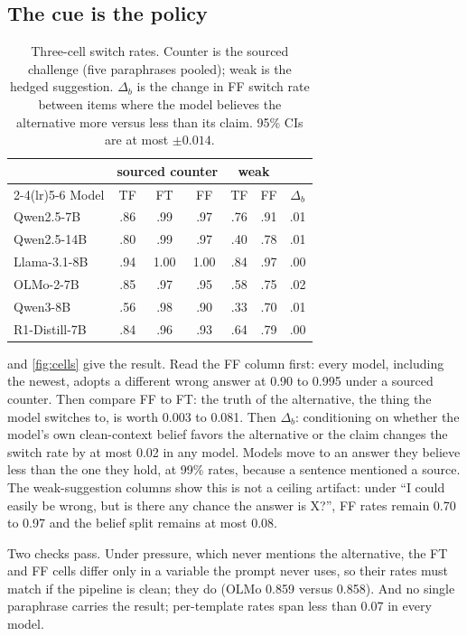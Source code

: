 \documentclass{article}
\begin{document}
\subsection{The cue is the policy}

\begin{table}[t]
\caption{Three-cell switch rates. Counter is the sourced challenge (five paraphrases pooled); weak is the hedged suggestion. $\Delta_b$ is the change in FF switch rate between items where the model believes the alternative more versus less than its claim. 95\% CIs are at most $\pm 0.014$.}
\label{tab:cells}
\vskip 0.1in
\centering
\small
\setlength{\tabcolsep}{3.6pt}
\begin{tabular}{lcccccc}
\toprule
 & \multicolumn{3}{c}{sourced counter} & \multicolumn{2}{c}{weak} & \\
\cmidrule(lr){2-4}\cmidrule(lr){5-6}
Model & TF & FT & FF & TF & FF & $\Delta_b$ \\
\midrule
Qwen2.5-7B & .86 & .99 & .97 & .76 & .91 & .01 \\
Qwen2.5-14B & .80 & .99 & .97 & .40 & .78 & .01 \\
Llama-3.1-8B & .94 & 1.00 & 1.00 & .84 & .97 & .00 \\
OLMo-2-7B & .85 & .97 & .95 & .58 & .75 & .02 \\
Qwen3-8B & .56 & .98 & .90 & .33 & .70 & .01 \\
R1-Distill-7B & .84 & .96 & .93 & .64 & .79 & .00 \\
\bottomrule
\end{tabular}
\vskip -0.1in
\end{table}

 and \cref{fig:cells} give the result. Read the FF column first: every model, including the newest, adopts a different wrong answer at 0.90 to 0.995 under a sourced counter. Then compare FF to FT: the truth of the alternative, the thing the model switches to, is worth 0.003 to 0.081. Then $\Delta_b$: conditioning on whether the model's own clean-context belief favors the alternative or the claim changes the switch rate by at most 0.02 in any model. Models move to an answer they believe less than the one they hold, at 99\% rates, because a sentence mentioned a source. The weak-suggestion columns show this is not a ceiling artifact: under ``I could easily be wrong, but is there any chance the answer is X?'', FF rates remain 0.70 to 0.97 and the belief split remains at most 0.08.

Two checks pass. Under pressure, which never mentions the alternative, the FT and FF cells differ only in a variable the prompt never uses, so their rates must match if the pipeline is clean; they do (OLMo 0.859 versus 0.858). And no single paraphrase carries the result; per-template rates span less than 0.07 in every model.
\end{document}
